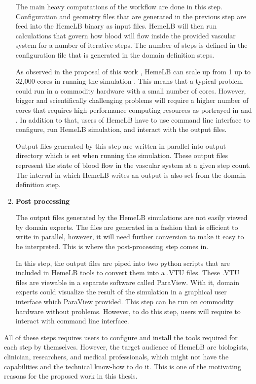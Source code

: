 \begin{enumerate}
The main heavy computations of the workflow are done in this step.  Configuration and geometry files that are generated in the previous step are feed into the HemeLB binary as input files. HemeLB will then run calculations that govern how blood will flow inside the provided vascular system for a number of iterative steps. The number of steps is defined in the configuration file that is generated in the domain definition steps. 

As observed in the proposal of this work \citep{Steven:2016aa}, HemeLB can scale up from 1 up to 32,000 cores in running the simulation \citep{groen2013analysing}. This means that a typical problem could run in a commodity hardware with a small number of cores. However, bigger and scientifically challenging problems will require a higher number of cores that requires high-performance computing resources as portrayed in \cite{franco2016non, franco2015dynamic} and \cite{bernabeu2015characterization}. In addition to that, users of HemeLB have to use command line interface to configure, run HemeLB simulation, and interact with the output files. 

Output files generated by this step are written in parallel into output directory which is set when running the simulation. These output files represent the state of blood flow in the vascular system at a given step count. The interval in which HemeLB writes an output is also set from the domain definition step.

\item{\textbf{Post processing}}

The output files generated by the HemeLB simulations are not easily viewed by domain experts. The files are generated in a fashion that is efficient to write in parallel, however, it will need further conversion to make it easy to be interpreted. This is where the post-processing step comes in.  

In this step, the output files are piped into two python scripts that are included in HemeLB tools to convert them into a .VTU files. These .VTU files are viewable in a separate software called ParaView. With it, domain experts could visualize the result of the simulation in a graphical user interface which ParaView provided. This step can be run on commodity hardware without problems. However, to do this step, users will require to interact with command line interface.

\end{enumerate}

All of these steps requires users to configure and install the tools required for each step by themselves. However, the target audience of HemeLB are biologists, clinician, researchers, and medical professionals, which might not have the capabilities and the technical know-how to do it. This is one of the motivating reasons for the proposed work in this thesis.




